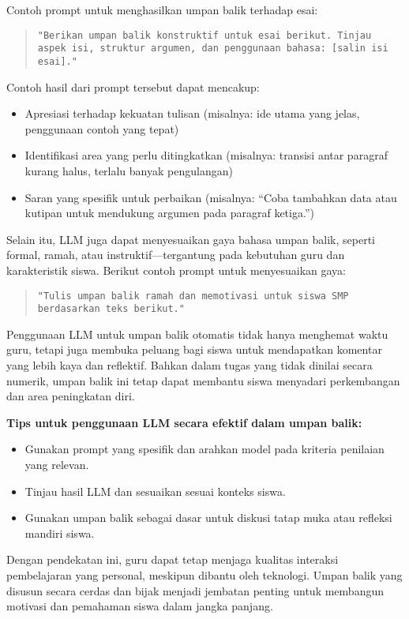 Contoh prompt untuk menghasilkan umpan balik terhadap esai:

\begin{quote}
	\centering
	\texttt{"Berikan umpan balik konstruktif untuk esai berikut. Tinjau aspek isi, struktur argumen, dan penggunaan bahasa: [salin isi esai]."}
\end{quote}

Contoh hasil dari prompt tersebut dapat mencakup:
\begin{itemize}
	\item Apresiasi terhadap kekuatan tulisan (misalnya: ide utama yang jelas, penggunaan contoh yang tepat)
	\item Identifikasi area yang perlu ditingkatkan (misalnya: transisi antar paragraf kurang halus, terlalu banyak pengulangan)
	\item Saran yang spesifik untuk perbaikan (misalnya: “Coba tambahkan data atau kutipan untuk mendukung argumen pada paragraf ketiga.”)
\end{itemize}

Selain itu, LLM juga dapat menyesuaikan gaya bahasa umpan balik, seperti formal, ramah, atau instruktif—tergantung pada kebutuhan guru dan karakteristik siswa. Berikut contoh prompt untuk menyesuaikan gaya:

\begin{quote}
	\centering
	\texttt{"Tulis umpan balik ramah dan memotivasi untuk siswa SMP berdasarkan teks berikut."}
\end{quote}

Penggunaan LLM untuk umpan balik otomatis tidak hanya menghemat waktu guru, tetapi juga membuka peluang bagi siswa untuk mendapatkan komentar yang lebih kaya dan reflektif. Bahkan dalam tugas yang tidak dinilai secara numerik, umpan balik ini tetap dapat membantu siswa menyadari perkembangan dan area peningkatan diri.

\textbf{Tips untuk penggunaan LLM secara efektif dalam umpan balik:}
\begin{itemize}
	\item Gunakan prompt yang spesifik dan arahkan model pada kriteria penilaian yang relevan.
	\item Tinjau hasil LLM dan sesuaikan sesuai konteks siswa.
	\item Gunakan umpan balik sebagai dasar untuk diskusi tatap muka atau refleksi mandiri siswa.
\end{itemize}

Dengan pendekatan ini, guru dapat tetap menjaga kualitas interaksi pembelajaran yang personal, meskipun dibantu oleh teknologi. Umpan balik yang disusun secara cerdas dan bijak menjadi jembatan penting untuk membangun motivasi dan pemahaman siswa dalam jangka panjang.


